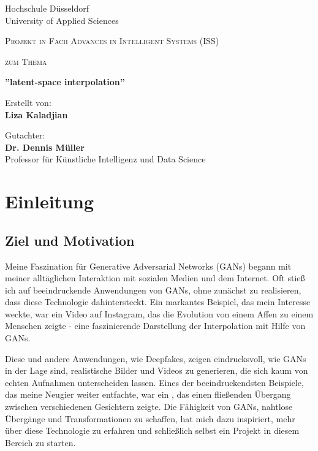 \documentclass[a4paper, 12pt]{article}
\title{\haThema}
\author{\haAutor}
\date{\today}
\newcommand{\haThema}{”latent-space interpolation”}
\newcommand{\haAutor}{Liza Kaladjian}
\newcommand{\haDeckblattTextEins}{Projekt in Fach Advances in Intelligent Systems (ISS)}
\newcommand{\haGutachter}{Dr. Dennis Müller}
\newcommand{\haGutachterText}{Professor für Künstliche Intelligenz und Data Science}
\begin{document}
\begin{titlepage}
Hochschule Düsseldorf \\
University of Applied Sciences	
\begin{center}
\vspace{1.5cm}
{\scshape\large \haDeckblattTextEins \par}
\vspace{1cm}
{\scshape\large zum Thema\par}
\vspace{1.5cm}
{\LARGE\bfseries \haThema \par}
\vfill
{Erstellt von:\\ {\bfseries \haAutor} \par}
\vspace{1cm}
\vspace{1cm}
Gutachter:\\ {\bfseries \haGutachter}\\ \haGutachterText
\vfill
\end{center}
\end{titlepage}
\thispagestyle{empty}
\newpage

\tableofcontents
\thispagestyle{empty}
\newpage

\setcounter{page}{1}

\section{Einleitung}
\subsection{Ziel und Motivation}
Meine Faszination für Generative Adversarial Networks (GANs) begann mit meiner alltäglichen Interaktion mit sozialen Medien und dem Internet. Oft stieß ich auf beeindruckende Anwendungen von GANs, ohne zunächst zu realisieren, dass diese Technologie dahintersteckt. Ein markantes Beispiel, das mein Interesse weckte, war ein Video auf Instagram, das die Evolution von einem Affen zu einem Menschen zeigte - eine faszinierende Darstellung der Interpolation mit Hilfe von GANs.

Diese und andere Anwendungen, wie Deepfakes, zeigen eindrucksvoll, wie GANs in der Lage sind, realistische Bilder und Videos zu generieren, die sich kaum von echten Aufnahmen unterscheiden lassen. Eines der beeindruckendsten Beispiele, das meine Neugier weiter entfachte, war ein \cite{gif_example}, das einen fließenden Übergang zwischen verschiedenen Gesichtern zeigte. Die Fähigkeit von GANs, nahtlose Übergänge und Transformationen zu schaffen, hat mich dazu inspiriert, mehr über diese Technologie zu erfahren und schließlich selbst ein Projekt in diesem Bereich zu starten.
\end{document}
